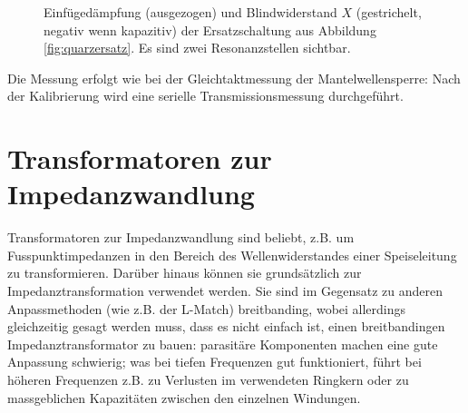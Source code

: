 \documentclass[twoside,a4paper,11pt,halfparskip,DIV=11,notitlepage]{scrartcl}
\newcommand{\uline}[1]{%
    \tikz[baseline=(todotted.base)]{
        \node[inner sep=1pt,outer sep=0pt] (todotted) {#1};
        \draw[color=HB9UFblue,thick] (todotted.south west) -- (todotted.south east);
    }%
}%
\newcommand{\udash}[1]{%
    \tikz[baseline=(todotted.base)]{
        \node[inner sep=1pt,outer sep=0pt] (todotted) {#1};
        \draw[dashed,color=HB9UFred,thick] (todotted.south west) -- (todotted.south east);
    }%
}%
\begin{document}
\begin{figure}[H]
\begin{center}
\end{center}
\caption{Einfügedämpfung (ausgezogen) und Blindwiderstand $X$ (gestrichelt, negativ wenn kapazitiv) der Ersatzschaltung
aus Abbildung \ref{fig:quarzersatz}. Es sind zwei Resonanzstellen sichtbar.}
\label{fig:quarzidealplot}
\end{figure}

Die Messung erfolgt wie bei der Gleichtaktmessung der Mantelwellensperre: Nach der Kalibrierung wird
eine serielle Transmissionsmessung durchgeführt.

\newpage %
\section{Transformatoren zur Impedanzwandlung}\label{sec:impedanztrafo}
Transformatoren zur Impedanzwandlung sind beliebt, z.B. um Fusspunktimpedanzen in den Bereich
des Wellenwiderstandes einer Speiseleitung zu transformieren. Darüber hinaus
können sie grundsätzlich zur Impedanztransformation verwendet werden. Sie sind im Gegensatz zu
anderen Anpassmethoden (wie z.B. der L-Match) breitbanding, wobei allerdings gleichzeitig gesagt
werden muss, dass es nicht einfach ist, einen breitbandingen Impedanztransformator zu bauen:
parasitäre Komponenten machen eine gute Anpassung schwierig; was bei tiefen Frequenzen gut
funktioniert, führt bei höheren Frequenzen z.B. zu Verlusten im verwendeten Ringkern oder
zu massgeblichen Kapazitäten zwischen den einzelnen Windungen.
\end{document}
